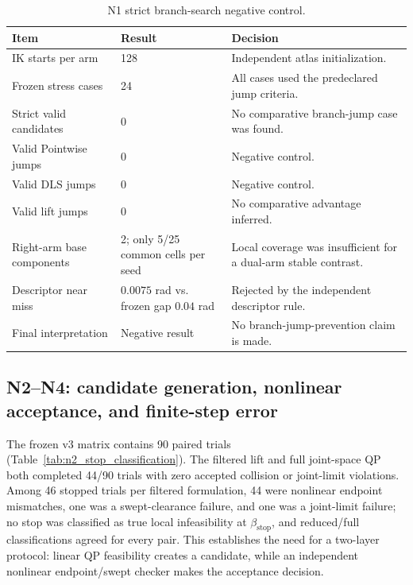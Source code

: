 \documentclass[preprint,12pt]{elsarticle}
\begin{document}
\begin{table}[t]
\centering
\small
\caption{N1 strict branch-search negative control.}
\label{tab:n1_branch_negative}
\begin{tabularx}{\textwidth}{@{}p{}p{}X@{}}
\toprule
Item & Result & Decision \\
\midrule
IK starts per arm & 128 & Independent atlas initialization. \\
Frozen stress cases & 24 & All cases used the predeclared jump criteria. \\
Strict valid candidates & 0 & No comparative branch-jump case was found. \\
Valid Pointwise jumps & 0 & Negative control. \\
Valid DLS jumps & 0 & Negative control. \\
Valid lift jumps & 0 & No comparative advantage inferred. \\
Right-arm base components & 2; only 5/25 common cells per seed & Local coverage was insufficient for a dual-arm stable contrast. \\
Descriptor near miss & $0.0075$ rad vs. frozen gap $0.04$ rad & Rejected by the independent descriptor rule. \\
Final interpretation & Negative result & No branch-jump-prevention claim is made. \\
\bottomrule
\end{tabularx}
\end{table}


\subsection{N2--N4: candidate generation, nonlinear acceptance, and finite-step error}

The frozen v3 matrix contains 90 paired trials (Table~\ref{tab:n2_stop_classification}). The filtered lift and full joint-space QP both completed 44/90 trials with zero accepted collision or joint-limit violations. Among 46 stopped trials per filtered formulation, 44 were nonlinear endpoint mismatches, one was a swept-clearance failure, and one was a joint-limit failure; no stop was classified as true local infeasibility at $\beta_{\mathrm{stop}}$, and reduced/full classifications agreed for every pair. This establishes the need for a two-layer protocol: linear QP feasibility creates a candidate, while an independent nonlinear endpoint/swept checker makes the acceptance decision.
\end{document}
